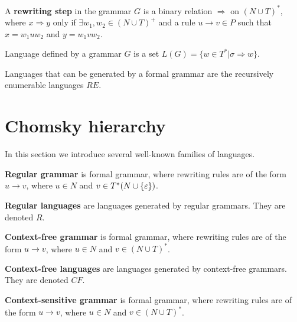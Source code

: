 \begin{definition}
A {\bf rewriting step} in the grammar $G$ is a binary relation $\Rightarrow$ on $(N\cup T)^*$, where $x\Rightarrow y$ only if $\exists w_1, w_2\in (N\cup T)^+$ and a rule $u\rightarrow v \in P$ such that $x=w_1uw_2$ and $y=w_1vw_2$.
\end{definition}

\begin{definition}
Language defined by a grammar $G$ is a set $L(G)=\{w\in T^*|\sigma\Rightarrow w\}$.
\end{definition}

Languages that can be generated by a formal grammar are the recursively enumerable languages $RE$.



\section{Chomsky hierarchy} %
\label{sec:chomsky_hierarchy}

In this section we introduce several well-known families of languages.

\begin{definition}
{\bf Regular grammar} is formal grammar, where rewriting rules are of the form $u\rightarrow v$, where $u\in N$ and $v\in T^*(N\cup \{\varepsilon\})$.
\end{definition}

\begin{definition}
{\bf Regular languages} are languages generated by regular grammars. They are denoted $R$.
\end{definition}

\begin{definition}
{\bf Context-free grammar} is formal grammar, where rewriting rules are of the form $u\rightarrow v$, where $u\in N$ and $v\in (N\cup T)^*$.
\end{definition}

\begin{definition}
{\bf Context-free languages} are languages generated by context-free grammars. They are denoted $CF$.
\end{definition}

\begin{definition}
{\bf Context-sensitive grammar} is formal grammar, where rewriting rules are of the form $u\rightarrow v$, where $u\in N$ and $v\in (N\cup T)^*$.
\end{definition}


